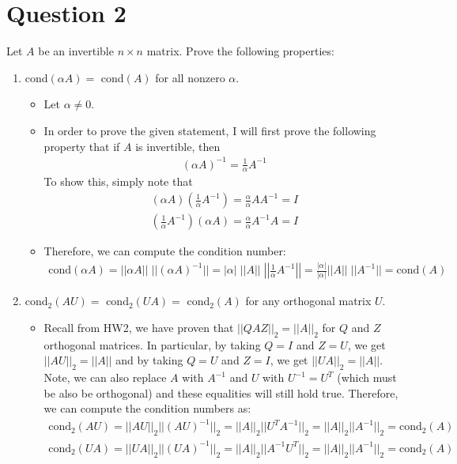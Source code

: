 \documentclass[10pt,a4paper]{article}
\theoremstyle{definition}
\theoremstyle{definition}
\numberwithin{equation}{section}
\begin{document}
\section*{Question 2}
Let $A$ be an invertible $n \times n$ matrix. Prove the following properties:
\begin{enumerate}[label = (\alph*)]
\item cond$(\alpha A) = $ cond$(A)$ for all nonzero $\alpha$. 
	\begin{itemize}
	\item Let $\alpha \neq 0$. 
	\item In order to prove the given statement, I will first prove the following property that if $A$ is invertible, then
	\begin{align*}
	(\alpha A)^{-1} = \frac{1}{\alpha} A^{-1}
	\end{align*}
	To show this, simply note that
	\begin{align*}
	(\alpha A) \left(\frac{1}{\alpha} A^{-1} \right) = \frac{\alpha}{\alpha} A A^{-1} = I\\
	\left(\frac{1}{\alpha} A^{-1} \right) (\alpha A) =\frac{\alpha}{\alpha} A^{-1}A = I
	\end{align*}
	\item Therefore, we can compute the condition number:
	\begin{align*}
	\text{cond}(\alpha A) = ||\alpha A||\;||(\alpha A)^{-1}|| = |\alpha|\; ||A||\; \left| \left| \frac{1}{\alpha} A^{-1} \right| \right| = \frac{|\alpha|}{|\alpha|} ||A|| \; ||A^{-1}|| = \text{cond}(A)
	\end{align*}
	\end{itemize}
\item cond$_2(AU) = $ cond$_2(UA) = $ cond$_2(A)$ for any orthogonal matrix $U$. 
	\begin{itemize}
	\item Recall from HW2, we have proven that $||QAZ||_2 = ||A||_2$ for $Q$ and $Z$ orthogonal matrices. In particular, by taking $Q = I$ and $Z = U$, we get $||AU||_2 = ||A||$ and by taking $Q = U$ and $Z = I$, we get $||UA||_2 = ||A||$. Note, we can also replace $A$ with $A^{-1}$ and $U$ with $U^{-1} = U^T$ (which must be also be orthogonal) and these equalities will still hold true. Therefore, we can compute the condition numbers as:
	\begin{align*}
	\text{cond}_2(AU) = ||AU||_2 ||(AU)^{-1}||_2 = ||A||_2 ||U^T A^{-1}||_2 = ||A||_2 ||A^{-1}||_2 = \text{cond}_2(A)\\
	\text{cond}_2(UA) = ||UA||_2 ||(UA)^{-1}||_2 = ||A||_2 ||A^{-1} U^T||_2 = ||A||_2 ||A^{-1}||_2 = \text{cond}_2(A)\\

\end{align*}
\end{itemize}
\end{enumerate}
\end{document}
